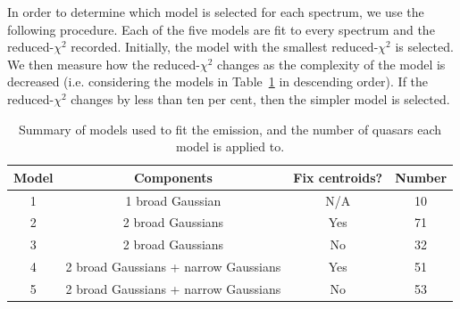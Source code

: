 In order to determine which model is selected for each spectrum, we use the following procedure.  
Each of the five models are fit to every spectrum and the reduced-$\chi^2$ recorded.
Initially, the model with the smallest reduced-$\chi^2$ is selected. 
We then measure how the reduced-$\chi^2$ changes as the complexity of the model is decreased (i.e. considering the models in Table~\ref{tab:hamod} in descending order). 
If the reduced-$\chi^2$ changes by less than ten per cent, then the simpler model is selected. 

\begin{table}
  \centering
  \small 
  \caption{Summary of models used to fit the \ha emission, and the number of quasars each model is applied to.}
  \label{tab:hamod}
    \begin{tabular}{cccc} 
    \hline
    Model     & Components & Fix centroids? & Number \\
    \hline
    1        & 1 broad Gaussian  & N/A &  10 \\
    2        & 2 broad Gaussians & Yes &  71 \\
    3        & 2 broad Gaussians & No  &  32 \\
    4        & 2 broad Gaussians + narrow Gaussians & Yes & 51 \\
    5        & 2 broad Gaussians + narrow Gaussians & No  & 53 \\
    \hline
    \end{tabular}
\end{table} 

